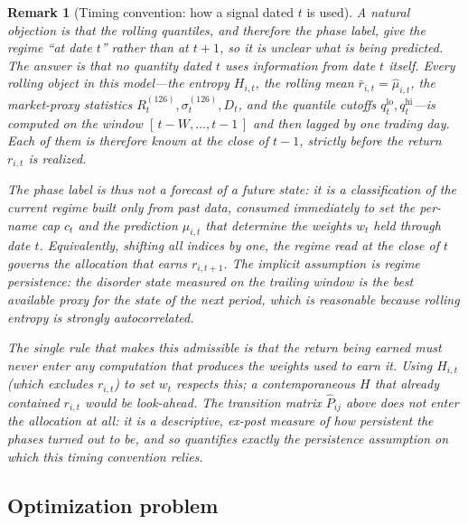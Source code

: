 \documentclass[a4paper,12pt]{article}
\newtheorem{remark}{Remark}[section]
\begin{document}
\begin{remark}[Timing convention: how a signal dated $t$ is used]
A natural objection is that the rolling quantiles, and therefore the phase label, give the regime ``at date $t$'' rather than at $t+1$, so it is unclear what is being predicted. The answer is that no quantity dated $t$ uses information from date $t$ itself. Every rolling object in this model---the entropy $H_{i,t}$, the rolling mean $\bar r_{i,t}=\widehat\mu_{i,t}$, the market-proxy statistics $R_t^{(126)},\sigma_t^{(126)},D_t$, and the quantile cutoffs $q^{\mathrm{lo}}_t,q^{\mathrm{hi}}_t$---is computed on the window $[\,t-W,\ldots,t-1\,]$ and then lagged by one trading day. Each of them is therefore \emph{known at the close of $t-1$}, strictly before the return $r_{i,t}$ is realized.

The phase label is thus not a forecast of a future state: it is a \emph{classification of the current regime} built only from past data, consumed immediately to set the per-name cap $c_t$ and the prediction $\widehat\mu_{i,t}$ that determine the weights $w_t$ held \emph{through} date $t$. Equivalently, shifting all indices by one, the regime read at the close of $t$ governs the allocation that earns $r_{i,t+1}$. The implicit assumption is \emph{regime persistence}: the disorder state measured on the trailing window is the best available proxy for the state of the next period, which is reasonable because rolling entropy is strongly autocorrelated.

The single rule that makes this admissible is that the return being earned must never enter any computation that produces the weights used to earn it. Using $H_{i,t}$ (which excludes $r_{i,t}$) to set $w_t$ respects this; a contemporaneous $H$ that already contained $r_{i,t}$ would be look-ahead. The transition matrix $\widehat P_{ij}$ above does not enter the allocation at all: it is a descriptive, ex-post measure of how persistent the phases turned out to be, and so quantifies exactly the persistence assumption on which this timing convention relies.
\end{remark}

\subsection{Optimization problem}
\end{document}
